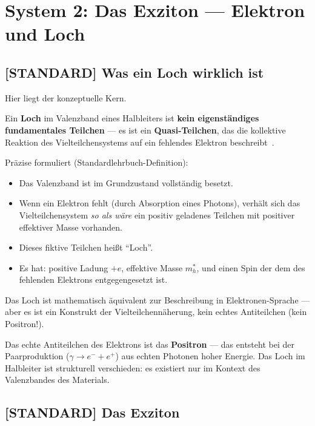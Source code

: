 \section{System 2: Das Exziton --- Elektron und Loch}
\label{sec:exziton}

\subsection{[STANDARD] Was ein Loch wirklich ist}

Hier liegt der konzeptuelle Kern.

\begin{important}
Ein \textbf{Loch} im Valenzband eines Halbleiters ist
\textbf{kein eigenständiges fundamentales Teilchen} ---
es ist ein \textbf{Quasi-Teilchen}, das die kollektive
Reaktion des Vielteilchensystems auf ein fehlendes Elektron
beschreibt~\cite{Kittel2004,AshcroftMermin1976}.

Präzise formuliert (Standardlehrbuch-Definition):
\begin{itemize}
  \item Das Valenzband ist im Grundzustand vollständig besetzt.
  \item Wenn ein Elektron fehlt (durch Absorption eines Photons),
    verhält sich das Vielteilchensystem \emph{so als wäre}
    ein positiv geladenes Teilchen mit positiver effektiver Masse
    vorhanden.
  \item Dieses fiktive Teilchen heißt ``Loch''.
  \item Es hat: positive Ladung $+e$, effektive Masse $m_h^*$,
    und einen Spin der dem des fehlenden Elektrons entgegengesetzt ist.
\end{itemize}

Das Loch ist mathematisch äquivalent zur Beschreibung
in Elektronen-Sprache --- aber es ist ein Konstrukt der
Vielteilchennäherung, kein echtes Antiteilchen
(kein Positron!).
\end{important}

Das echte Antiteilchen des Elektrons ist das \textbf{Positron} ---
das entsteht bei der Paarproduktion ($\gamma \to e^- + e^+$)
aus echten Photonen hoher Energie. Das Loch im Halbleiter
ist strukturell verschieden: es existiert nur im Kontext
des Valenzbandes des Materials.

\subsection{[STANDARD] Das Exziton}

